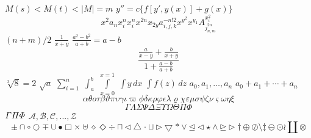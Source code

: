 \documentclass{article}
\begin{document}
	$M(s)<M(t)<|M|=m$
	$y''=c\{f[y',y(x)] + g(x)\}$
	\begin{displaymath}
		x^2 a_n x^n_i x_i^n
		x^{2n} x_{2y} a_{i,j,k}^{-n!2}
		x^{y^2} x^{y_1}
		A^{x_i^2}_{j^{2n}_{n,m}}
	\end{displaymath}
	$(n+m)/2$
	$\frac{1}{x+y}$
	$\frac{a^2 - b^2}{a+b} = a-b$
	\[ \frac{\frac{a}{x-y} + \frac{b}{x+y}}{1+\frac{a-b}{a+b}} \]
	$\sqrt[3]{8} = 2$
	$\sqrt{a}$
	$\sum_{i=1}^n$
	$\int_a^b$
	$\int\limits_{x=0}^{x=1}$
	$\int y\,dx$
	$\int f(z)\,dz$
	$a_0, a_1,\ldots,a_n$
	$a_0 + a_1 + \cdots + a_n$
	\begin{displaymath}
		\alpha \theta o \tau
		\beta \vartheta \pi \upsilon
		\gamma \iota \varpi \phi
		\delta \kappa \rho	\varphi
		\epsilon \lambda \varrho \chi
		\varepsilon \mu \sigma \psi
		\zeta \nu \varsigma \omega
		\eta \xi
	\end{displaymath}
	\begin{displaymath}
		\Gamma \Lambda \Sigma \Psi
		\Delta \Xi \Upsilon \Omega
		\Theta \Pi	\Phi
	\end{displaymath}
	$\mathnormal{\Gamma\Pi\Phi}$ %
	$\mathcal{A, B, C,...,Z}$
	\begin{displaymath}
		\pm \cap \circ \bigcirc
		\mp \cup \bullet \Box
		\times \uplus \diamond \Diamond
		\div \sqcap \lhd \bigtriangleup
		\cdot \sqcup \rhd \bigtriangledown
		\ast \vee \unlhd \triangleleft
		\star \wedge \unrhd \triangleright
		\dagger \oplus \oslash \setminus
		\ddagger \ominus \odot \wr
		\amalg \otimes
	\end{displaymath}
\end{document}
